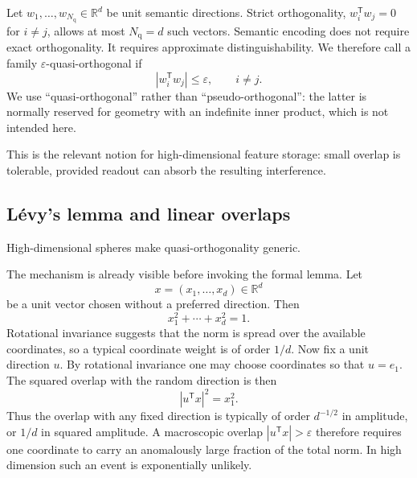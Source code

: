\documentclass[
  aps,
  reprint,
  superscriptaddress,
  floatfix,
  nofootinbib,
  longbibliography
]{revtex4-2}
\newcommand{\R}{\mathbb{R}}
\newcommand{\Nq}{N_{\mathrm q}}
\newcommand{\T}{^{\mathsf{T}}}
\begin{document}
Let $w_{1},\dots,w_{\Nq}\in\R^{d}$ be unit semantic directions. Strict
orthogonality, $w_i\T w_j=0$ for $i\neq j$, allows at most $\Nq=d$ such
vectors. Semantic
encoding does not require exact orthogonality. It requires approximate
distinguishability. We therefore call a family
$\varepsilon$-quasi-orthogonal if
%
\begin{equation}
\label{eq:quasiortho}
|w_i\T w_j|\le \varepsilon,\qquad i\neq j .
\end{equation}
%
We use ``quasi-orthogonal'' rather than ``pseudo-orthogonal'': the latter is
normally reserved for geometry with an indefinite inner product, which is not
intended here.

This is the relevant notion for high-dimensional feature storage:
small overlap is tolerable, provided readout can absorb the resulting
interference.

\subsection{L\'evy's lemma and linear overlaps}
\label{sec:levy}

High-dimensional spheres make quasi-orthogonality generic.

The mechanism is already visible before invoking the formal lemma.  Let
\[
        x=(x_1,\ldots,x_d)\in\R^d
\]
be a unit vector chosen without a preferred direction.  Then
\[
        x_1^2+\cdots+x_d^2=1 .
\]
Rotational invariance suggests that the norm is spread over the available
coordinates, so a typical coordinate weight is of order $1/d$.  Now fix a
unit direction $u$.  By rotational invariance one may choose coordinates so
that $u=e_1$.  The squared overlap with the random direction is then
\[
        |u\T x|^2=x_1^2 .
\]
Thus the overlap with any fixed direction is typically of order $d^{-1/2}$
in amplitude, or $1/d$ in squared amplitude.  A macroscopic overlap
$|u\T x|>\varepsilon$ therefore requires one coordinate to carry an
anomalously large fraction of the total norm.  In high dimension such an
event is exponentially unlikely.
\end{document}
